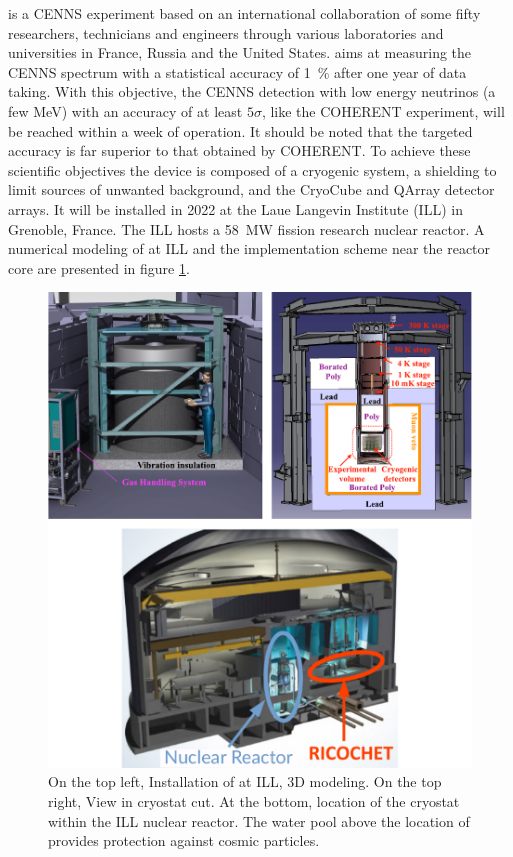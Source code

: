 \Ricochet{} is a CENNS experiment based on an international collaboration of
some fifty researchers, technicians and engineers through various laboratories and universities in France, Russia and the United States. \Ricochet{} aims at measuring the CENNS spectrum with a statistical accuracy of \SI{1}{\percent} after one year of data taking. With this objective, the CENNS detection with low energy neutrinos (a few \si{\mega\eV}) with an accuracy of at least $5\sigma$, like the COHERENT experiment, will be reached within a week of operation. 
It should be noted that the targeted accuracy is far superior to that obtained by COHERENT. To achieve these scientific objectives the \Ricochet{} device is composed of a cryogenic system, a shielding to limit sources of unwanted background, and the CryoCube and QArray detector arrays. It will be installed in 2022 at the Laue Langevin Institute (ILL) in Grenoble, France. The ILL hosts a \SI{58}{\mega\watt} fission research nuclear reactor. A numerical modeling of \Ricochet{} at ILL and the implementation scheme near the reactor core are presented in figure \ref{fig:ricochet-ill-site}.

\begin{figure}
\centering
\includegraphics[scale=1]{Figures/Introduction/ricochet_ill_site.pdf}
\caption{On the top left, Installation of \Ricochet{} at ILL, 3D modeling. On the top right, View in
cryostat cut. At the bottom, location of the \Ricochet{} cryostat within the ILL nuclear reactor. The water pool above the location of \Ricochet{} provides protection against cosmic particles.}
\label{fig:ricochet-ill-site}
\end{figure}

